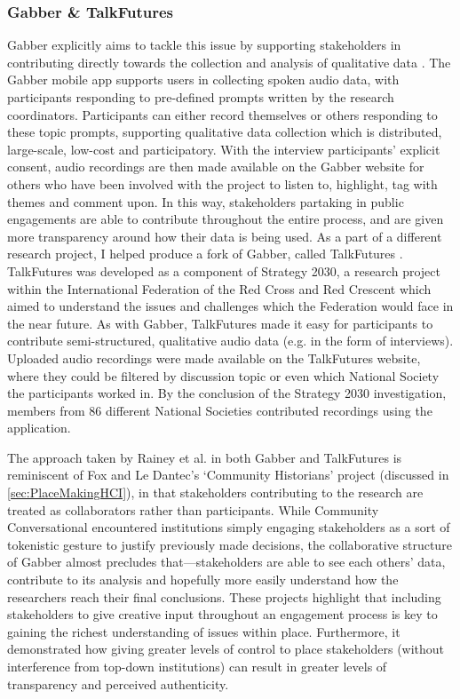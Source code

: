 \subsubsection{Gabber \& TalkFutures}
Gabber explicitly aims to tackle this issue by supporting stakeholders in contributing directly towards the collection and analysis of qualitative data \citep{Rainey2019}. The Gabber mobile app supports users in collecting spoken audio data, with participants responding to pre-defined prompts written by the research coordinators. Participants can either record themselves or others responding to these topic prompts, supporting qualitative data collection which is distributed, large-scale, low-cost and participatory. With the interview participants' explicit consent, audio recordings are then made available on the Gabber website for others who have been involved with the project to listen to, highlight, tag with themes and comment upon. In this way, stakeholders partaking in public engagements are able to contribute throughout the entire process, and are given more transparency around how their data is being used. As a part of a different research project, I helped produce a fork of Gabber, called TalkFutures \citep{Rainey2020}. TalkFutures was developed as a component of Strategy 2030, a research project within the International Federation of the Red Cross and Red Crescent which aimed to understand the issues and challenges which the Federation would face in the near future. As with Gabber, TalkFutures made it easy for participants to contribute semi-structured, qualitative audio data (e.g. in the form of interviews). Uploaded audio recordings were made available on the TalkFutures website, where they could be filtered by discussion topic or even which National Society the participants worked in. By the conclusion of the Strategy 2030 investigation, members from 86 different National Societies contributed recordings using the application.

The approach taken by Rainey et al. in both Gabber and TalkFutures is reminiscent of Fox and Le Dantec's `Community Historians' project (discussed in \ref{sec:PlaceMakingHCI}), in that stakeholders contributing to the research are treated as collaborators rather than participants. While Community Conversational encountered institutions simply engaging stakeholders as a sort of tokenistic gesture to justify previously made decisions, the collaborative structure of Gabber almost precludes that---stakeholders are able to see each others' data, contribute to its analysis and hopefully more easily understand how the researchers reach their final conclusions. These projects highlight that including stakeholders to give creative input throughout an engagement process is key to gaining the richest understanding of issues within place. Furthermore, it demonstrated how giving greater levels of control to place stakeholders (without interference from top-down institutions) can result in greater levels of transparency and perceived authenticity.

